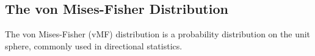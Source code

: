 \subsection{The von Mises-Fisher Distribution}

The von Mises-Fisher (vMF) distribution is a probability distribution on the unit sphere, commonly used in directional statistics. 